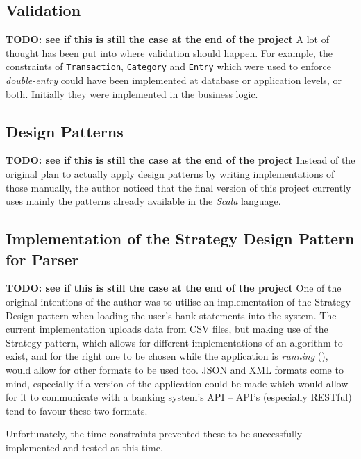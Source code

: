 \subsection{Validation} \label{sec:Reflections.Validation} 
\textbf{TODO: see if this is still the case at the end of the project}
A lot of thought has been put into where validation should happen. For example,
the constraints of \texttt{Transaction}, \texttt{Category} and \texttt{Entry}
which were used to enforce \emph{double-entry} could have been implemented at
database or application levels, or both. Initially they were implemented in the
business logic.

\subsection{Design Patterns} \label{sec:Reflections.DesignPatterns}
\textbf{TODO: see if this is still the case at the end of the project}
Instead of the original plan to actually apply design patterns by writing
implementations of those manually, the author noticed that the final version of
this project currently uses mainly the patterns already available in the
\emph{Scala} language.

\subsection{Implementation of the Strategy Design Pattern for Parser}
\textbf{TODO: see if this is still the case at the end of the project}
One of the original intentions of the author was to utilise an implementation
of the Strategy Design pattern when loading the user's bank statements into the
system. The current implementation uploads data from CSV files, but making use
of the Strategy pattern, which allows for different implementations of an
algorithm to exist, and for the right one to be chosen while the application is
\emph{running} (\cite[][Ch.~8,~Location~3152]{nikolov2016scala}), would allow
for other formats to be used too. JSON and XML formats come to mind, especially
if a version of the application could be made which would allow for it to
communicate with a banking system's API -- API's (especially RESTful) tend to
favour these two formats.

Unfortunately, the time constraints prevented these to be successfully
implemented and tested at this time.

